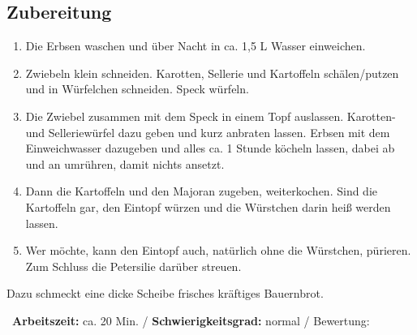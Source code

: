 \begin{minipage}[t]{0.58\textwidth}
\vspace{0pt}
\subsection*{Zubereitung}
\begin{enumerate}[leftmargin=*, itemindent=14pt]

\item Die Erbsen waschen und über Nacht in ca. 1,5 L Wasser einweichen. 

\item Zwiebeln klein schneiden. Karotten, Sellerie und Kartoffeln schälen/putzen und in Würfelchen schneiden. Speck würfeln.

\item Die Zwiebel zusammen mit dem Speck in einem Topf auslassen. Karotten- und Selleriewürfel dazu geben und kurz anbraten lassen. Erbsen mit dem Einweichwasser dazugeben und alles ca. 1 Stunde köcheln lassen, dabei ab und an umrühren, damit nichts ansetzt. 

\item Dann die Kartoffeln und den Majoran zugeben, weiterkochen. Sind die Kartoffeln gar, den Eintopf würzen und die Würstchen darin heiß werden lassen. 

\item Wer möchte, kann den Eintopf auch, natürlich ohne die Würstchen, pürieren. Zum Schluss die Petersilie darüber streuen.

\end{enumerate}

Dazu schmeckt eine dicke Scheibe frisches kräftiges Bauernbrot.
\end{minipage}
\vfill
\decothreeright \, \textbf{Arbeitszeit:} ca. 20 Min.	 / \textbf{Schwierigkeitsgrad:} normal	 / \decothreeleft \hfill Bewertung: \CIRCLE \CIRCLE \CIRCLE \CIRCLE \Circle